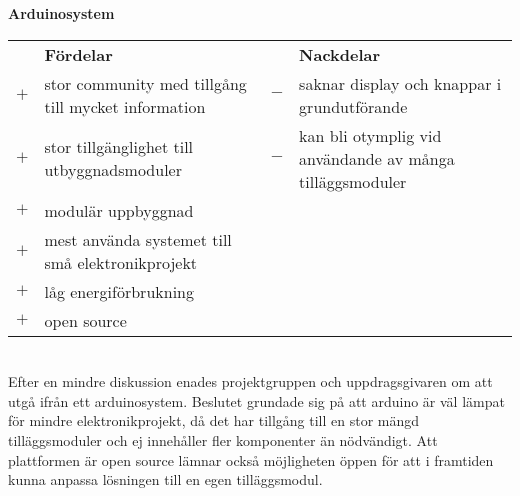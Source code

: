 \documentclass{article}
\begin{document}
			\noindent\textsf{\textbf{Arduinosystem}}\\
			\begin{tabularx}{\textwidth}{@{}cXcX}
				& \textbf{Fördelar} 	& & \textbf{Nackdelar} \\
				$+$ & stor community med tillgång till mycket information & $-$ & saknar display och knappar i grundutförande \\
				$+$ & stor tillgänglighet till utbyggnadsmoduler & $-$ & kan bli otymplig vid användande av många tilläggsmoduler \\
				$+$ & modulär uppbyggnad \\
				$+$ & mest använda systemet till små elektronikprojekt \\
				$+$ & låg energiförbrukning \\
				$+$ & open source \\
			\end{tabularx} \\

			\vspace{2mm}\noindent Efter en mindre diskussion enades projektgruppen och uppdragsgivaren om att utgå ifrån ett arduinosystem. Beslutet grundade sig på att arduino är väl lämpat för mindre elektronikprojekt, då det har tillgång till en stor mängd tilläggsmoduler och ej innehåller fler komponenter än nödvändigt. Att plattformen är open source lämnar också möjligheten öppen för att i framtiden kunna anpassa lösningen till en egen tilläggsmodul.
\end{document}
